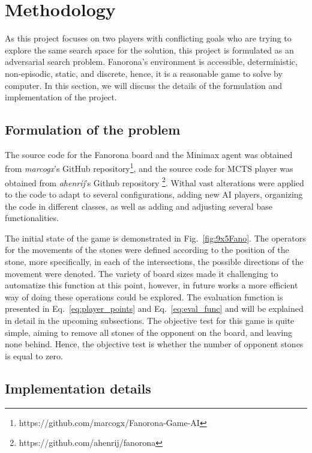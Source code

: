 \documentclass[journal]{IEEEtran}
\begin{document}
\section{Methodology}
\label{section:Methodology}

As this project focuses on two players with conflicting goals who are trying to explore the same search space for the solution, this project is formulated as an adversarial search problem. Fanorona's environment is accessible, deterministic, non-episodic, static, and discrete, hence, it is a reasonable game to solve by computer. In this section, we will discuss the details of the formulation and implementation of the project. 


\subsection{Formulation of the problem}
The source code for the Fanorona board and the Minimax agent was obtained from \emph{marcogx}'s GitHub repository\footnote{https://github.com/marcogx/Fanorona-Game-AI}, and the source code for MCTS player was obtained from \emph{ahenrij}'s Github repository \footnote{https://github.com/ahenrij/fanorona}.
Withal vast alterations were applied to the code to adapt to several configurations, adding new AI players, organizing the code in different classes, as well as adding and adjusting several base functionalities.

The initial state of the game is demonstrated in Fig.~\ref{fig:9x5Fano}.
The operators for the movements of the stones were defined according to the position of the stone, more specifically, in each of the intersections, the possible directions of the movement were denoted. The variety of board sizes made it challenging to automatize this function at this point, however, in future works a more efficient way of doing these operations could be explored. 
The evaluation function is presented in Eq.~\ref{eq:player_points} and Eq.~\ref{eq:eval_func} and will be explained in detail in the upcoming subsections.
The objective test for this game is quite simple, aiming to remove all stones of the opponent on the board, and leaving none behind. Hence, the objective test is whether the number of opponent stones is equal to zero. 


\subsection{Implementation details}
\end{document}

